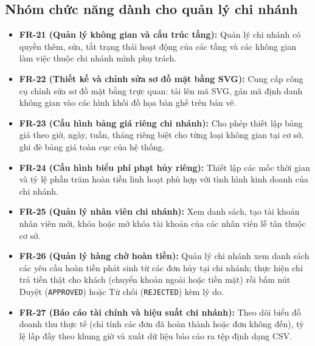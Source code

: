 \subsection{Nhóm chức năng dành cho quản lý chi nhánh}
\begin{itemize}
    \item \textbf{FR-21 (Quản lý không gian và cấu trúc tầng):} Quản lý chi nhánh có quyền thêm, sửa, tắt trạng thái hoạt động của các tầng và các không gian làm việc thuộc chi nhánh mình phụ trách.
    \item \textbf{FR-22 (Thiết kế và chỉnh sửa sơ đồ mặt bằng SVG):} Cung cấp công cụ chỉnh sửa sơ đồ mặt bằng trực quan: tải lên mã SVG, gán mã định danh không gian vào các hình khối đồ họa bàn ghế trên bản vẽ.
    \item \textbf{FR-23 (Cấu hình bảng giá riêng chi nhánh):} Cho phép thiết lập bảng giá theo giờ, ngày, tuần, tháng riêng biệt cho từng loại không gian tại cơ sở, ghi đè bảng giá toàn cục của hệ thống.
    \item \textbf{FR-24 (Cấu hình biểu phí phạt hủy riêng):} Thiết lập các mốc thời gian và tỷ lệ phần trăm hoàn tiền linh hoạt phù hợp với tình hình kinh doanh của chi nhánh.
    \item \textbf{FR-25 (Quản lý nhân viên chi nhánh):} Xem danh sách, tạo tài khoản nhân viên mới, khóa hoặc mở khóa tài khoản của các nhân viên lễ tân thuộc cơ sở.
    \item \textbf{FR-26 (Quản lý hàng chờ hoàn tiền):} Quản lý chi nhánh xem danh sách các yêu cầu hoàn tiền phát sinh từ các đơn hủy tại chi nhánh; thực hiện chi trả tiền thật cho khách (chuyển khoản ngoài hoặc tiền mặt) rồi bấm nút Duyệt (\texttt{APPROVED}) hoặc Từ chối (\texttt{REJECTED}) kèm lý do.
    \item \textbf{FR-27 (Báo cáo tài chính và hiệu suất chi nhánh):} Theo dõi biểu đồ doanh thu thực tế (chỉ tính các đơn đã hoàn thành hoặc đơn không đến), tỷ lệ lấp đầy theo khung giờ và xuất dữ liệu báo cáo ra tệp định dạng CSV.
\end{itemize}

